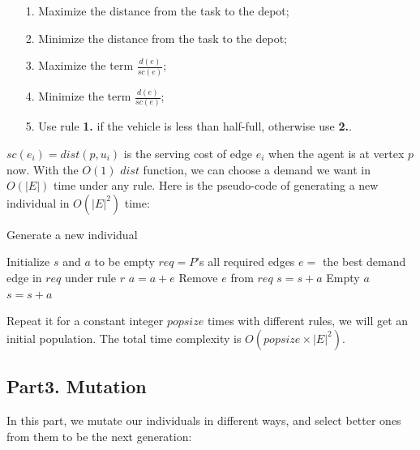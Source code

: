 \documentclass[lettersize,journal]{IEEEtran}
\begin{document}
\begin{itemize}
    \item [1.] Maximize the distance from the task to the depot;
    \item [2.] Minimize the distance from the task to the depot;
    \item [3.] Maximize the term $\frac{d(e)}{sc(e)}$;
    \item [4.] Minimize the term $\frac{d(e)}{sc(e)}$;
    \item [5.] Use rule \textbf{1.} if the vehicle is less than half-full, otherwise use \textbf{2.}\cite{ref3}.
\end{itemize}

$sc(e_i)=dist(p,u_i)$ is the serving cost of edge $e_i$ when the agent is at vertex $p$ now. With the $O(1)$ $dist$ function, we can choose a demand we want in $O(|E|)$ time under any rule. Here is the pseudo-code of generating a new individual in $O(|E|^2)$ time:

\begin{algorithm}
    \caption{Generate a new individual}
    Initialize $s$ and $a$ to be empty\;
    $req=P$'s all required edges\;
     {
        $e=$ the best demand edge in $req$ under rule $r$\;
         {
            $a=a+e$\;
            Remove $e$ from $req$\;
        } {
            $s=s+a$\;
            Empty $a$\;
        }
    }
    $s=s+a$\;
\end{algorithm}

Repeat it for a constant integer $popsize$ times with different rules, we will get an initial population. The total time complexity is $O(popsize\times|E|^2)$.

\subsection{Part3. Mutation}

In this part, we mutate our individuals in different ways, and select better ones from them to be the next generation:
\end{document}
